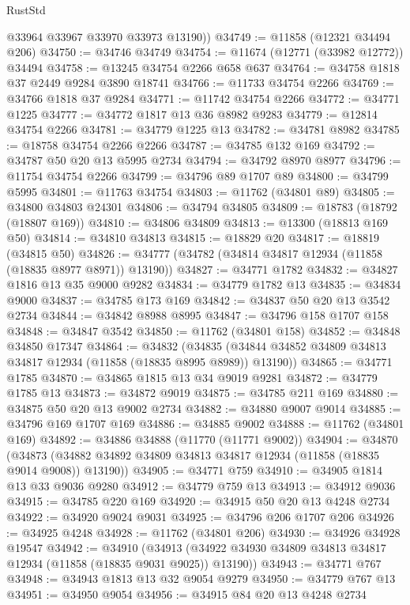 \begin{lexlean}{RustStd}
\begin{coremodule}
        @33964
        @33967
        @33970
        @33973
        @13190))
@34749 := @11858 (@12321 @34494 @206)
@34750 := @34746 @34749
@34754 := @11674 (@12771 (@33982 @12772)) @34494
@34758 := @13245 @34754 @2266 @658 @637
@34764 := @34758 @1818 @37 @2449 @9284 @3890 @18741
@34766 := @11733 @34754 @2266
@34769 := @34766 @1818 @37 @9284
@34771 := @11742 @34754 @2266
@34772 := @34771 @1225
@34777 := @34772 @1817 @13 @36 @8982 @9283
@34779 := @12814 @34754 @2266
@34781 := @34779 @1225 @13
@34782 := @34781 @8982
@34785 := @18758 @34754 @2266 @2266
@34787 := @34785 @132 @169
@34792 := @34787 @50 @20 @13 @5995 @2734
@34794 := @34792 @8970 @8977
@34796 := @11754 @34754 @2266
@34799 := @34796 @89 @1707 @89
@34800 := @34799 @5995
@34801 := @11763 @34754
@34803 := @11762 (@34801 @89)
@34805 := @34800 @34803 @24301
@34806 := @34794 @34805
@34809 := @18783 (@18792 (@18807 @169))
@34810 := @34806 @34809
@34813 := @13300 (@18813 @169 @50)
@34814 := @34810 @34813
@34815 := @18829 @20
@34817 := @18819 (@34815 @50)
@34826 := @34777 (@34782 (@34814 @34817 @12934 (@11858 (@18835 @8977 @8971)) @13190))
@34827 := @34771 @1782
@34832 := @34827 @1816 @13 @35 @9000 @9282
@34834 := @34779 @1782 @13
@34835 := @34834 @9000
@34837 := @34785 @173 @169
@34842 := @34837 @50 @20 @13 @3542 @2734
@34844 := @34842 @8988 @8995
@34847 := @34796 @158 @1707 @158
@34848 := @34847 @3542
@34850 := @11762 (@34801 @158)
@34852 := @34848 @34850 @17347
@34864 := @34832
    (@34835 (@34844 @34852 @34809 @34813 @34817 @12934 (@11858 (@18835 @8995 @8989)) @13190))
@34865 := @34771 @1785
@34870 := @34865 @1815 @13 @34 @9019 @9281
@34872 := @34779 @1785 @13
@34873 := @34872 @9019
@34875 := @34785 @211 @169
@34880 := @34875 @50 @20 @13 @9002 @2734
@34882 := @34880 @9007 @9014
@34885 := @34796 @169 @1707 @169
@34886 := @34885 @9002
@34888 := @11762 (@34801 @169)
@34892 := @34886 @34888 (@11770 (@11771 @9002))
@34904 := @34870
    (@34873 (@34882 @34892 @34809 @34813 @34817 @12934 (@11858 (@18835 @9014 @9008)) @13190))
@34905 := @34771 @759
@34910 := @34905 @1814 @13 @33 @9036 @9280
@34912 := @34779 @759 @13
@34913 := @34912 @9036
@34915 := @34785 @220 @169
@34920 := @34915 @50 @20 @13 @4248 @2734
@34922 := @34920 @9024 @9031
@34925 := @34796 @206 @1707 @206
@34926 := @34925 @4248
@34928 := @11762 (@34801 @206)
@34930 := @34926 @34928 @19547
@34942 := @34910
    (@34913 (@34922 @34930 @34809 @34813 @34817 @12934 (@11858 (@18835 @9031 @9025)) @13190))
@34943 := @34771 @767
@34948 := @34943 @1813 @13 @32 @9054 @9279
@34950 := @34779 @767 @13
@34951 := @34950 @9054
@34956 := @34915 @84 @20 @13 @4248 @2734

\end{coremodule}
\end{lexlean}
